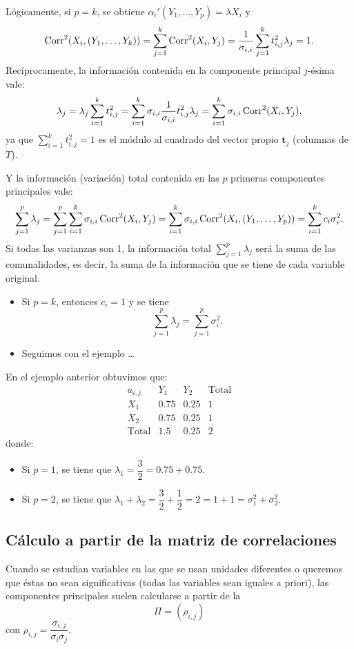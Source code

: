 Lógicamente, si $p=k$, se obtiene $\alpha_i'(Y_1,\dots,Y_p)=\lambda X_i$ y \[ \operatorname{Corr}^2(X_i,(Y_1,\dots,Y_k))=\sum_{j=1}^{k}\operatorname{Corr}^2(X_i,Y_j)=\dfrac{1}{\sigma_{i,i}}\sum_{j=1}^{k}t_{i,j}^2\lambda_j=1. \]
Recíprocamente, la información contenida en la componente principal $j$-ésima vale: \[ \lambda_j=\lambda_j\sum_{i=1}^{k}t_{i,j}^2=\sum_{i=1}^{k}\sigma_{i,i}\dfrac{1}{\sigma_{i,i}}t_{i,j}^2\lambda_j=\sum_{i=1}^{k}\sigma_{i,i}\operatorname{Corr}^2(X_i,Y_j), \] ya que $\sum_{i=1}^{k}t_{i,j}^2=1$ es el módulo al cuadrado del vector propio $\mathbf{t}_j$ (columnas de $T$).

Y la información (variación) total contenida en las $p$ primeras componentes principales vale: \[ \sum_{j=1}^{p}\lambda_j=\sum_{j=1}^{p}\sum_{i=1}^{k}\sigma_{i,i}\operatorname{Corr}^2(X_i,Y_j)=\sum_{i=1}^{k}\sigma_{i,i}\operatorname{Corr}^2(X_i,(Y_1,\dots,Y_p))=\sum_{i=1}^{k}c_i\sigma_i^2. \]
Si todas las varianzas son 1, la información total $\sum_{j=1}^{p}\lambda_j$ será la suma de las comunalidades, es decir, la suma de la información que se tiene de cada variable original.
\begin{itemize}
	\item Si $p=k$, entonces $c_i=1$ y se tiene \[ \sum_{j=1}^{p}\lambda_j=\sum_{j=1}^{p}\sigma_i^2. \]
\end{itemize}
\begin{itemize}[label=\color{red}\textbullet, leftmargin=*]
	\item \color{lightblue}Seguimos con el ejemplo \dots
\end{itemize}
En el ejemplo anterior obtuvimos que: \[ \begin{array}{c|c|c|c}
	a_{i,j} & Y_1 & Y_2 & \text{Total}\\ \hline
	X_1 & 0.75 & 0.25 & 1\\ \hline
	X_2 & 0.75 & 0.25 & 1\\ \hline
	\text{Total} & 1.5 & 0.25 & 2
\end{array} \]donde:
\begin{itemize}
	\item Si $p=1$, se tiene que $\lambda_1=\dfrac{3}{2}=0.75+0.75$.
	\item Si $p=2$, se tiene que $\lambda_1+\lambda_2=\dfrac{3}{2}+\dfrac{1}{2}=2=1+1=\sigma_1^2+\sigma_2^2$.
\end{itemize}
\subsection{Cálculo a partir de la matriz de correlaciones}
Cuando se estudian variables en las que se usan unidades diferentes o queremos que éstas no sean significativas (todas las variables sean iguales a priori), las componentes principales suelen calcularse a partir de la  \[ \Pi=(\rho_{i,j}) \]con $\rho_{i,j}=\dfrac{\sigma_{i,j}}{\sigma_i\sigma_j}$.

